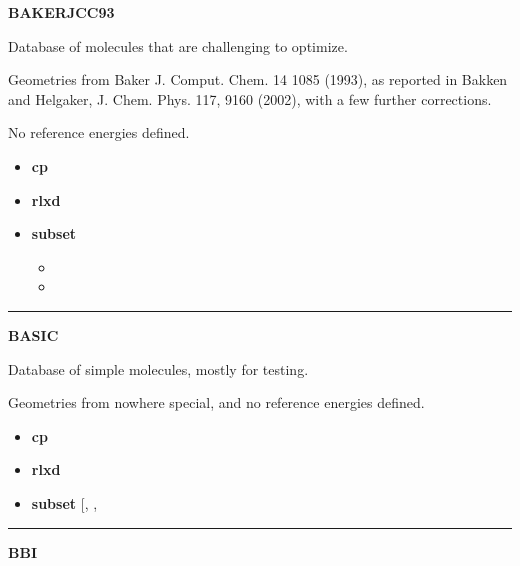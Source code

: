 \documentclass[letterpaper,10pt,english]{sphinxmanual}
\begin{document}
\label{index:module-BAKERJCC93}
\textbf{BAKERJCC93}

\begin{DUlineblock}{0em}
\item[] Database of molecules that are challenging to optimize.
\item[] Geometries from Baker J. Comput. Chem. 14 1085 (1993), as reported
in Bakken and Helgaker, J. Chem. Phys. 117, 9160 (2002), with a few
further corrections.
\item[] No reference energies defined.
\end{DUlineblock}
\begin{itemize}
\item {} 
\textbf{cp}  

\item {} 
\textbf{rlxd} 

\item {} 
\textbf{subset}
\begin{itemize}
\item {} 

\item {} 

\end{itemize}

\end{itemize}


\bigskip\hrule{}\bigskip

\label{index:module-BASIC}
\textbf{BASIC}

\begin{DUlineblock}{0em}
\item[] Database of simple molecules, mostly for testing.
\item[] Geometries from nowhere special, and no reference energies defined.
\end{DUlineblock}
\begin{itemize}
\item {} 
\textbf{cp}  

\item {} 
\textbf{rlxd} 

\item {} 
\textbf{subset} {[}, , \code{'ch4'}{]}

\end{itemize}


\bigskip\hrule{}\bigskip

\label{index:module-BBI}
\textbf{BBI}
\end{document}
